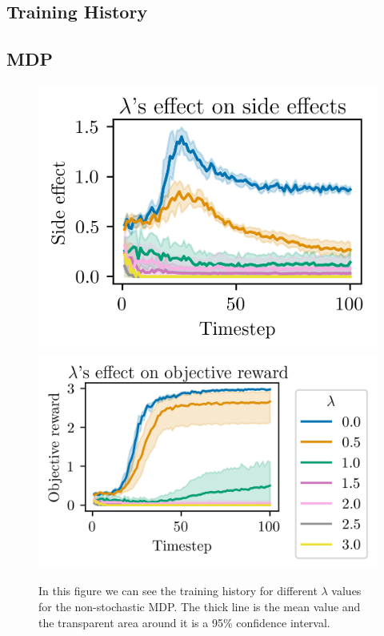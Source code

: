 \documentclass[12pt,A4]{report}
\theoremstyle{definition}
\begin{document}
\begin{appendices}
\chapter{Training History}

\section{MDP}
\begin{figure}[H]
  \centering
  \includegraphics{"./figures/static_8x8_side_effects.png"}
  \includegraphics{"./figures/static_8x8_objective_reward.png"}
  \caption{In this figure we can see the training history for different $\lambda$ values for the non-stochastic MDP. The thick line is the mean value and the transparent area around it is a 95\% confidence interval.}
  \label{fig:results_static_8x8}
\end{figure}


\end{appendices}
\end{document}
